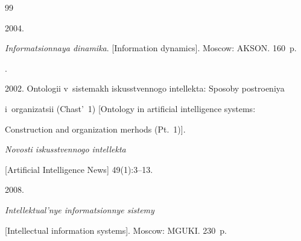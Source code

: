 

















\renewcommand{\bibname}{\protect\rmfamily References}







{\small\frenchspacing


{%




\begin{thebibliography}{99}







 2004. 


\textit{Informatsionnaya dinamika}. [Information dynamics]. Moscow: AKSON. 160~p. 







.


2002. Ontologii v~sistemakh iskusstvennogo intellekta: Sposoby postroeniya 


i~organizatsii (Chast'~1) [Ontology in artificial intelligence systems: 


Construction and organization merhods (Pt.~1)]. 


\textit{Novosti iskusstvennogo intellekta}


[Artificial Intelligence News] 49(1):3--13.




 2008. 


\textit{Intellektual'nye informatsionnye sistemy} 


[Intellectual information systems]. Moscow: MGUKI. 230~p.









\end{thebibliography}}}
